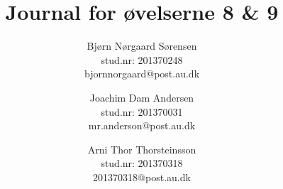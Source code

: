 

	\chead{\myTitle}	\rhead{\today}
\lfoot{}		\cfoot{}			\rfoot{\thepage}
\renewcommand{\headrulewidth}{1pt}
\renewcommand{\footrulewidth}{0pt}

\newcommand{\myTitle}{\textbf{Journal for øvelserne 8 \& 9}}

\title{\myTitle}
\author{
	Bjørn Nørgaard Sørensen\\
	stud.nr: 201370248\\
	bjornnorgaard@post.au.dk
	\and
	Joachim Dam Andersen\\
	stud.nr: 201370031\\
	mr.anderson@post.au.dk
	\and
	Arni Thor Thorsteinsson\\
	stud.nr: 201370318\\
	201370318@post.au.dk
}


	\maketitle
	
	
	\newpage
	
	\newpage
	
	\newpage
	

